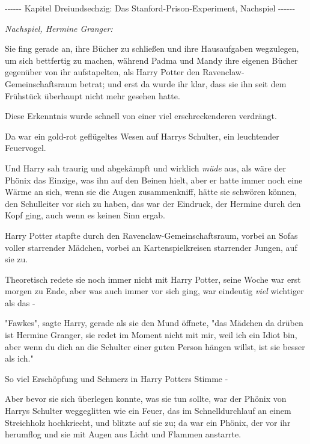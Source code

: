 

\hypertarget{das-stanford-prison-experiment-nachspiel}{%

-\/-\/-\/-\/-\/- Kapitel Dreiundsechzig: Das Stanford-Prison-Experiment, Nachspiel -\/-\/-\/-\/-\/-

\emph{Nachspiel, Hermine Granger:}

Sie fing gerade an, ihre Bücher zu schließen und ihre Hausaufgaben wegzulegen, um sich bettfertig zu machen, während Padma und Mandy ihre eigenen Bücher gegenüber von ihr aufstapelten, als Harry Potter den Ravenclaw-Gemeinschaftsraum betrat; und erst da wurde ihr klar, dass sie ihn seit dem Frühstück überhaupt nicht mehr gesehen hatte.

Diese Erkenntnis wurde schnell von einer viel erschreckenderen verdrängt.

Da war ein gold-rot geflügeltes Wesen auf Harrys Schulter, ein leuchtender Feuervogel.

Und Harry sah traurig und abgekämpft und wirklich \emph{müde} aus, als wäre der Phönix das Einzige, was ihn auf den Beinen hielt, aber er hatte immer noch eine Wärme an sich, wenn sie die Augen zusammenkniff, hätte sie schwören können, den Schulleiter vor sich zu haben, das war der Eindruck, der Hermine durch den Kopf ging, auch wenn es keinen Sinn ergab.

Harry Potter stapfte durch den Ravenclaw-Gemeinschaftsraum, vorbei an Sofas voller starrender Mädchen, vorbei an Kartenspielkreisen starrender Jungen, auf sie zu.

Theoretisch redete sie noch immer nicht mit Harry Potter, seine Woche war erst morgen zu Ende, aber was auch immer vor sich ging, war eindeutig \emph{viel} wichtiger als das -

"Fawkes", sagte Harry, gerade als sie den Mund öffnete, "das Mädchen da drüben ist Hermine Granger, sie redet im Moment nicht mit mir, weil ich ein Idiot bin, aber wenn du dich an die Schulter einer guten Person hängen willst, ist sie besser als ich."

So viel Erschöpfung und Schmerz in Harry Potters Stimme -

Aber bevor sie sich überlegen konnte, was sie tun sollte, war der Phönix von Harrys Schulter weggeglitten wie ein Feuer, das im Schnelldurchlauf an einem Streichholz hochkriecht, und blitzte auf sie zu; da war ein Phönix, der vor ihr herumflog und sie mit Augen aus Licht und Flammen anstarrte.

}
